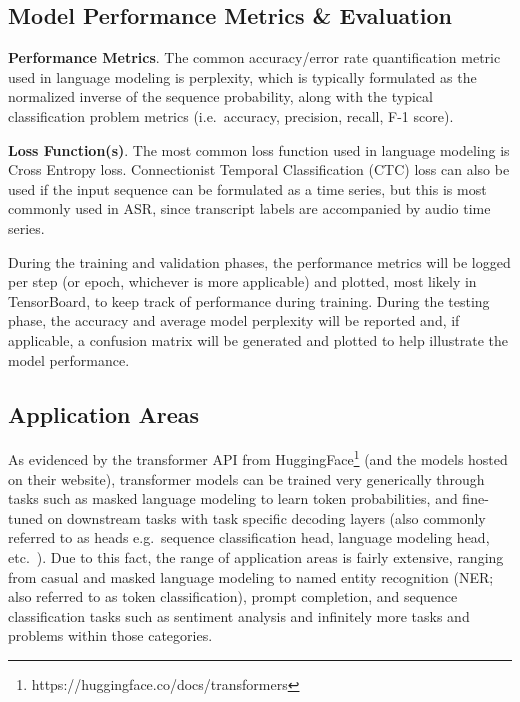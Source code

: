 \documentclass[10pt]{article}
\begin{document}
        \subsection{Model Performance Metrics \& Evaluation}
        \textbf{Performance Metrics}.
        The common accuracy/error rate quantification metric used in language modeling is perplexity, which is typically formulated as
        the normalized inverse of the sequence probability, along with the typical classification problem metrics (i.e.~accuracy,
        precision, recall, F-1 score).


        \textbf{Loss Function(s)}.
        The most common loss function used in language modeling is Cross Entropy loss. Connectionist Temporal Classification (CTC) loss
        can also be used if the input sequence can be formulated as a time series, but this is most commonly used in ASR, since
        transcript labels are accompanied by audio time series.


        During the training and validation phases, the performance metrics will be logged per step (or epoch, whichever is more
        applicable) and plotted, most likely in TensorBoard, to keep track of performance during training. During the testing phase,
        the accuracy and average model perplexity will be reported and, if applicable, a confusion matrix will be generated and plotted
        to help illustrate the model performance.


        \subsection{Application Areas}
        As evidenced by the transformer API from HuggingFace\footnote{https://huggingface.co/docs/transformers} (and the models hosted
        on their website), transformer models can be trained very generically through tasks such as masked language modeling to learn
        token probabilities, and fine-tuned on downstream tasks with task specific decoding layers (also commonly referred to as heads
        e.g.~sequence classification head, language modeling head, etc.~). Due to this fact, the range of application areas is fairly
        extensive, ranging from casual and masked language modeling to named entity recognition (NER; also referred to as token
        classification), prompt completion, and sequence classification tasks such as sentiment analysis and infinitely more tasks and
        problems within those categories.
\end{document}
